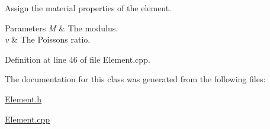 Assign the material properties of the element. 


\begin{DoxyParams}{Parameters}
{\em M} & The modulus. \\
\hline
{\em v} & The Poisson\textquotesingle{}s ratio. \\
\hline
\end{DoxyParams}


Definition at line 46 of file Element.\+cpp.



The documentation for this class was generated from the following files\+:\begin{DoxyCompactItemize}
\item 
\mbox{\hyperlink{_element_8h}{Element.\+h}}\item 
\mbox{\hyperlink{_element_8cpp}{Element.\+cpp}}\end{DoxyCompactItemize}
